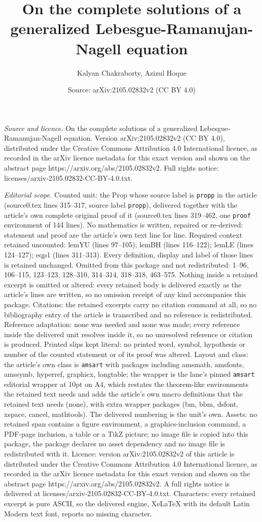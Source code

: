 \documentclass[10pt,a4paper]{amsart}
\title[On the complete solutions of a generalized Lebesgue-Ramanuja]{On the complete solutions of a generalized Lebesgue-Ramanujan-Nagell equation}
\author{Kalyan Chakraborty, Azizul Hoque}
\date{Source: arXiv:2105.02832v2 (CC BY 4.0)}
\begin{document}
\maketitle

\noindent\emph{Source and licence.} On the complete solutions of a generalized Lebesgue-Ramanujan-Nagell equation. Version arXiv:2105.02832v2 (CC BY 4.0), distributed under the Creative Commons Attribution 4.0 International licence, as recorded in the arXiv licence metadata for this exact version and shown on the abstract page https://arxiv.org/abs/2105.02832v2. Full rights notice: licenses/arxiv-2105.02832-CC-BY-4.0.txt.\par\smallskip

\noindent\textit{Editorial scope.} Counted unit: the Prop whose source label is \texttt{propp} in the article (source0.tex lines 315--317, source label \texttt{propp}), delivered together with the article's own complete original proof of it (source0.tex lines 319--462, one \texttt{proof} environment of 144 lines). No mathematics is written, repaired or re-derived: statement and proof are the article's own text line for line. Required context retained uncounted: lemYU (lines 97--105); lemBH (lines 116--122); lemLE (lines 124--127); eqp1 (lines 311--313). Every definition, display and label of those lines is retained unchanged. Omitted from this package and not redistributed: 1--96, 106--115, 123--123, 128--310, 314--314, 318--318, 463--575. Nothing inside a retained excerpt is omitted or altered: every retained body is delivered exactly as the article's lines are written, so no omission receipt of any kind accompanies this package. Citations: the retained excerpts carry no citation command at all, so no bibliography entry of the article is transcribed and no reference is redistributed. Reference adaptation: none was needed and none was made; every reference inside the delivered unit resolves inside it, so no unresolved reference or citation is produced. Printed slips kept literal: no printed word, symbol, hypothesis or number of the counted statement or of its proof was altered. Layout and class: the article's own class is \texttt{amsart} with packages including amsmath, amsfonts, amssymb, hyperref, graphicx, longtable; the wrapper is the lane's pinned \texttt{amsart} editorial wrapper at 10pt on A4, which restates the theorem-like environments the retained text needs and adds the article's own macro definitions that the retained text needs (none), with extra wrapper packages (bm, bbm, dsfont, xspace, cancel, mathtools). The delivered numbering is the unit's own. Assets: no retained span contains a figure environment, a graphics-inclusion command, a PDF-page inclusion, a table or a TikZ picture; no image file is copied into this package, the package declares no asset dependency and no image file is redistributed with it. Licence: version arXiv:2105.02832v2 of this article is distributed under the Creative Commons Attribution 4.0 International licence, as recorded in the arXiv licence metadata for this exact version and shown on the abstract page https://arxiv.org/abs/2105.02832v2. A full rights notice is delivered at licenses/arxiv-2105.02832-CC-BY-4.0.txt. Characters: every retained excerpt is pure ASCII, so the delivered engine, XeLaTeX with its default Latin Modern text font, reports no missing character.
\end{document}

